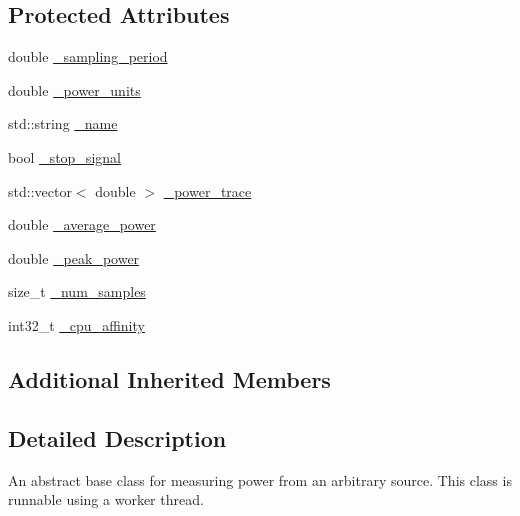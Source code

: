 \subsection*{Protected Attributes}
\begin{DoxyCompactItemize}
\item 
double \hyperlink{classxmem_1_1power_1_1_power_reader_a1c7d9b505d3c94347c43437a568e5948}{\-\_\-sampling\-\_\-period}
\item 
double \hyperlink{classxmem_1_1power_1_1_power_reader_a2835c933bd4807d6b3133a521dd76641}{\-\_\-power\-\_\-units}
\item 
std\-::string \hyperlink{classxmem_1_1power_1_1_power_reader_a85791da354d03c0a0f7ca4cf38b89e4c}{\-\_\-name}
\item 
bool \hyperlink{classxmem_1_1power_1_1_power_reader_a1c0c890279f3f2b7eb41ab3e5889bf2e}{\-\_\-stop\-\_\-signal}
\item 
std\-::vector$<$ double $>$ \hyperlink{classxmem_1_1power_1_1_power_reader_ac8ad4bada42912ece1cbb0769dbe3b4d}{\-\_\-power\-\_\-trace}
\item 
double \hyperlink{classxmem_1_1power_1_1_power_reader_a1ad637b79a21519c20f9dda64fc1b908}{\-\_\-average\-\_\-power}
\item 
double \hyperlink{classxmem_1_1power_1_1_power_reader_a0bfe4f56c143f3febb404d85558e45fa}{\-\_\-peak\-\_\-power}
\item 
size\-\_\-t \hyperlink{classxmem_1_1power_1_1_power_reader_a296a8d15083e01e33590cbcd836aa07b}{\-\_\-num\-\_\-samples}
\item 
int32\-\_\-t \hyperlink{classxmem_1_1power_1_1_power_reader_a0f95e6c4e8caa6db8de3fcf78509e887}{\-\_\-cpu\-\_\-affinity}
\end{DoxyCompactItemize}
\subsection*{Additional Inherited Members}


\subsection{Detailed Description}
An abstract base class for measuring power from an arbitrary source. This class is runnable using a worker thread. 

